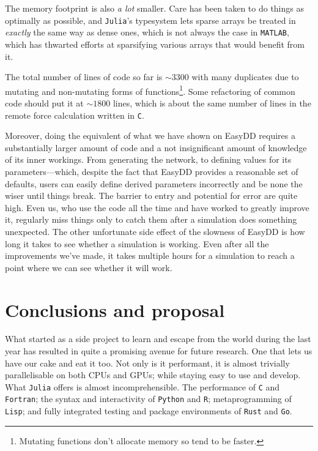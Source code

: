 The memory footprint is also \emph{a lot} smaller. Care has been taken to do things as optimally as possible, and \texttt{Julia}'s typesystem lets sparse arrays be treated in \emph{exactly} the same way as dense ones, which is not always the case in \texttt{MATLAB}, which has thwarted efforts at sparsifying various arrays that would benefit from it.

The total number of lines of code so far is $\sim 3300$ with many duplicates due to mutating and non-mutating forms of functions\footnote{Mutating functions don't allocate memory so tend to be faster.}. Some refactoring of common code should put it at $\sim 1800$ lines, which is about the same number of lines in the remote force calculation written in \texttt{C}.

Moreover, doing the equivalent of what we have shown on EasyDD requires a substantially larger amount of code and a not insignificant amount of knowledge of its inner workings. From generating the network, to defining values for its parameters---which, despite the fact that EasyDD provides a reasonable set of defaults, users can easily define derived parameters incorrectly and be none the wiser until things break. The barrier to entry and potential for error are quite high. Even us, who use the code all the time and have worked to greatly improve it, regularly miss things only to catch them after a simulation does something unexpected. The other unfortunate side effect of the slowness of EasyDD is how long it takes to see whether a simulation is working. Even after all the improvements we've made, it takes multiple hours for a simulation to reach a point where we can see whether it will work.

\section{Conclusions and proposal}\label{s:concProp}

What started as a side project to learn and escape from the world during the last year has resulted in quite a promising avenue for future research. One that lets us have our cake and eat it too. Not only is it performant, it is almost trivially parallelisable on both CPUs and GPUs; while staying easy to use and develop. What \texttt{Julia} offers is almost incomprehensible. The performance of \texttt{C} and \texttt{Fortran}; the syntax and interactivity of \texttt{Python} and \texttt{R}; metaprogramming of \texttt{Lisp}; and fully integrated testing and package environments of \texttt{Rust} and \texttt{Go}.

